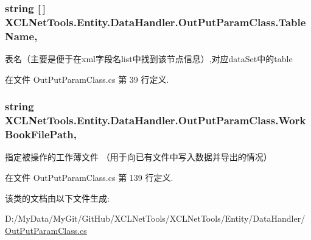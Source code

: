 \hypertarget{class_x_c_l_net_tools_1_1_entity_1_1_data_handler_1_1_out_put_param_class_a26c55a710bc326b9b4a40b0e868af278}{
\subsubsection[{Table\-Name}]{\setlength{\rightskip}{0pt plus 5cm}string \mbox{[}$\,$\mbox{]} X\-C\-L\-Net\-Tools.\-Entity.\-Data\-Handler.\-Out\-Put\-Param\-Class.\-Table\-Name\hspace{0.3cm}{\ttfamily [get]}, {\ttfamily [set]}}}\label{class_x_c_l_net_tools_1_1_entity_1_1_data_handler_1_1_out_put_param_class_a26c55a710bc326b9b4a40b0e868af278}


表名（主要是便于在xml字段名list中找到该节点信息）,对应data\-Set中的table 



在文件 Out\-Put\-Param\-Class.\-cs 第 39 行定义.

\hypertarget{class_x_c_l_net_tools_1_1_entity_1_1_data_handler_1_1_out_put_param_class_a7f0453621ff08ae63105219ae9108d8a}{
\subsubsection[{Work\-Book\-File\-Path}]{\setlength{\rightskip}{0pt plus 5cm}string X\-C\-L\-Net\-Tools.\-Entity.\-Data\-Handler.\-Out\-Put\-Param\-Class.\-Work\-Book\-File\-Path\hspace{0.3cm}{\ttfamily [get]}, {\ttfamily [set]}}}\label{class_x_c_l_net_tools_1_1_entity_1_1_data_handler_1_1_out_put_param_class_a7f0453621ff08ae63105219ae9108d8a}


指定被操作的工作薄文件 （用于向已有文件中写入数据并导出的情况） 



在文件 Out\-Put\-Param\-Class.\-cs 第 139 行定义.



该类的文档由以下文件生成\-:\begin{DoxyCompactItemize}
\item 
D\-:/\-My\-Data/\-My\-Git/\-Git\-Hub/\-X\-C\-L\-Net\-Tools/\-X\-C\-L\-Net\-Tools/\-Entity/\-Data\-Handler/\hyperlink{_out_put_param_class_8cs}{Out\-Put\-Param\-Class.\-cs}\end{DoxyCompactItemize}
